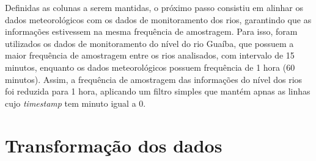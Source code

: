 Definidas as colunas a serem mantidas, o próximo passo consistiu em alinhar os dados meteorológicos com os dados de monitoramento dos rios, garantindo que as informações estivessem na mesma frequência de amostragem. Para isso, foram utilizados os dados de monitoramento do nível do rio Guaíba, que possuem a maior frequência de amostragem entre os rios analisados, com intervalo de 15 minutos, enquanto os dados meteorológicos possuem frequência de 1 hora (60 minutos). Assim, a frequência de amostragem das informações do nível dos rios foi reduzida para 1 hora, aplicando um filtro simples que mantém apnas as linhas cujo \textit{timestamp} tem minuto igual a 0.


\section{Transformação dos dados}



